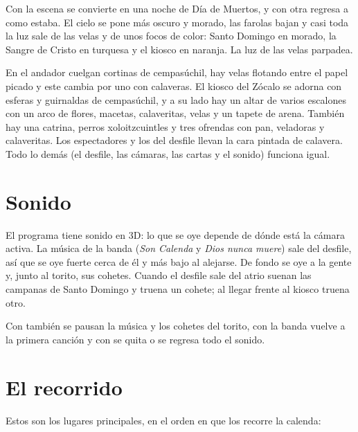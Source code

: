 \documentclass[11pt,a4paper]{article}
\begin{document}
Con  la escena se convierte en una noche de Día de Muertos, y con otra  regresa a como estaba. El cielo se pone más oscuro y morado, las farolas bajan y casi toda la luz sale de las velas y de unos focos de color: Santo Domingo en morado, la Sangre de Cristo en turquesa y el kiosco en naranja. La luz de las velas parpadea.

En el andador cuelgan cortinas de cempasúchil, hay velas flotando entre el papel picado y este cambia por uno con calaveras. El kiosco del Zócalo se adorna con esferas y guirnaldas de cempasúchil, y a su lado hay un altar de varios escalones con un arco de flores, macetas, calaveritas, velas y un tapete de arena. También hay una catrina, perros xoloitzcuintles y tres ofrendas con pan, veladoras y calaveritas. Los espectadores y los del desfile llevan la cara pintada de calavera. Todo lo demás (el desfile, las cámaras, las cartas y el sonido) funciona igual.


\section{Sonido}

El programa tiene sonido en 3D: lo que se oye depende de dónde está la cámara activa. La música de la banda (\textit{Son Calenda} y \textit{Dios nunca muere}) sale del desfile, así que se oye fuerte cerca de él y más bajo al alejarse. De fondo se oye a la gente y, junto al torito, sus cohetes. Cuando el desfile sale del atrio suenan las campanas de Santo Domingo y truena un cohete; al llegar frente al kiosco truena otro.

Con  también se pausan la música y los cohetes del torito, con  la banda vuelve a la primera canción y con  se quita o se regresa todo el sonido.

\section{El recorrido}

Estos son los lugares principales, en el orden en que los recorre la calenda:
\end{document}
